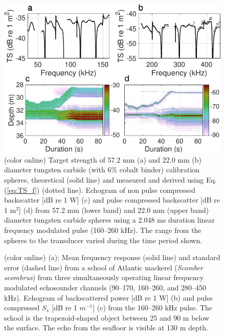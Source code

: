 \documentclass[preprint,12pt,TurnOnLineNumbers]{JASAnew}
\newcommand{\sv}{S_{\textrm{v}}}
\begin{document}
\begin{figure}
\includegraphics[width=16cm]{Fig_ts_example}
\caption{\label{fi:ts_example}(color online) Target strength of 57.2 mm (a) and 22.0 mm (b) diameter tungsten carbide (with 6\% cobalt binder) calibration spheres, theoretical (solid line) and measured and derived using Eq. (\ref{eq:TS_f}) (dotted line). Echogram of non pulse compressed backscatter [dB re 1 W] (c) and pulse compressed backscatter [dB re 1 $\textrm{m}^2$] (d) from 57.2 mm (lower band) and 22.0 mm (upper band) diameter tungsten carbide spheres using a 2.048 ms duration linear frequency modulated pulse (160--260 kHz). The range from the spheres to the transducer varied during the time period shown.}
\end{figure}

\begin{figure}
\caption{\label{fi:sv_example}(color online) (a): Mean frequency response (solid line) and standard error (dashed line) from a school of Atlantic mackerel (\textit{Scomber scombrus}) from three simultaneously operating linear frequency modulated echosounder channels (90--170, 160--260, and 280--450 kHz). Echogram of backscattered power [dB re 1 W] (b) and pulse compressed $\sv$ [dB re 1 $m^{-1}$] (c) from the 160--260 kHz pulse. The school is the trapezoid-shaped object between 25 and 90 m below the surface. The echo from the seafloor is visible at 130 m depth.} \end{figure}
\end{document}
